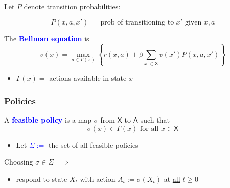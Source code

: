 \documentclass[xcolor=dvipsnames]{beamer}
\renewcommand{\geq}{\geqslant}
\newcommand{\navy}[1]{\textcolor{Blue}{\bf #1}}
\newcommand{\Asf}{\mathsf A}
\newcommand{\Xsf}{\mathsf X}
\renewcommand{\geq}{\geqslant}
\newcommand{\1}{\mathbbm 1}
\begin{document}
\begin{frame}



    Let $P$ denote transition probabilities:

    \begin{equation*}
        P(x, a, x') = \text{ prob of transitioning to $x'$ given $x, a$}
    \end{equation*}

    \vspace{0.5em}

    
    The \navy{Bellman equation} is
    \begin{equation*}
            v(x)
            = \max_{a \in \Gamma(x)}
            \left\{
                r(x, a)
                + \beta
                \sum_{x' \in \Xsf} v(x') P(x, a, x')
            \right\}
    \end{equation*}
    \vspace{0.5em}
    \vspace{0.5em}

    \begin{itemize}
        \item $\Gamma(x) =$ actions available in state $x$
    \end{itemize}


\end{frame}


\begin{frame}
    \frametitle{Policies}

    
    A \navy{feasible policy} is a map $\sigma$ from $\Xsf$ to $\Asf$ such that
    \begin{equation*}
            \sigma(x) \in \Gamma(x) \text{ for all } x \in \Xsf
    \end{equation*}

    \begin{itemize}
        \item Let \navy{$\Sigma := $} the set of all feasible policies
    \end{itemize}

    \vspace{0.5em}
    \vspace{0.5em}
    \vspace{0.5em}

    Choosing $\sigma \in \Sigma$ $\implies$
    \begin{itemize}
        \item[] respond to state $X_t$ with action $A_t := \sigma(X_t)$ at 
        \underline{all} $t \geq 0$
    \end{itemize}



\end{frame}
\end{document}
